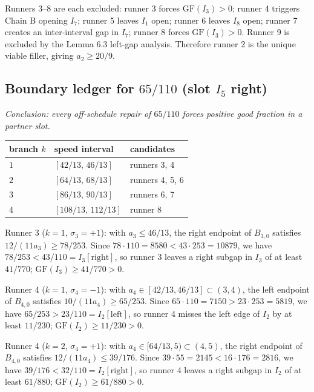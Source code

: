\documentclass[12pt]{article}
\begin{document}
Runners 3--8 are each excluded: runner 3 forces $\mathrm{GF}(I_3)>0$; runner 4 triggers
Chain B opening $I_7$; runner 5 leaves $I_1$ open; runner 6 leaves $I_8$ open;
runner 7 creates an inter-interval gap in $I_7$; runner 8 forces $\mathrm{GF}(I_3)>0$.
Runner 9 is excluded by the Lemma 6.3 left-gap analysis.
Therefore runner 2 is the unique viable filler, giving $a_2\ge 20/9$.

\subsection{Boundary ledger for $65/110$ (slot $I_5$ right)}

\emph{Conclusion: every off-schedule repair of $65/110$ forces positive good fraction in a
partner slot.}

\begin{center}
\begin{tabular}{@{}lll@{}}
\toprule
branch $k$ & speed interval & candidates \\
\midrule
$1$ & $[42/13,\,46/13]$ & runners 3, 4 \\
$2$ & $[64/13,\,68/13]$ & runners 4, 5, 6 \\
$3$ & $[86/13,\,90/13]$ & runners 6, 7 \\
$4$ & $[108/13,\,112/13]$ & runner 8 \\
\bottomrule
\end{tabular}
\end{center}

Runner 3 ($k=1$, $\sigma_3=+1$): with $a_3\le 46/13$, the right endpoint of $B_{3,0}$
satisfies $12/(11a_3)\ge 78/253$. Since $78\cdot110=8580<43\cdot253=10879$, we have
$78/253<43/110=I_3[\text{right}]$, so runner 3 leaves a right subgap in $I_3$ of at
least $41/770$; $\mathrm{GF}(I_3)\ge 41/770>0$.

Runner 4 ($k=1$, $\sigma_4=-1$): with $a_4\in[42/13,46/13]\subset(3,4)$, the left
endpoint of $B_{4,0}$ satisfies $10/(11a_4)\ge 65/253$. Since
$65\cdot110=7150>23\cdot253=5819$, we have $65/253>23/110=I_2[\text{left}]$, so runner 4
misses the left edge of $I_2$ by at least $11/230$; $\mathrm{GF}(I_2)\ge 11/230>0$.

Runner 4 ($k=2$, $\sigma_4=+1$): with $a_4\in[64/13,5)\subset(4,5)$, the right endpoint
of $B_{4,0}$ satisfies $12/(11a_4)\le 39/176$. Since $39\cdot55=2145<16\cdot176=2816$,
we have $39/176<32/110=I_2[\text{right}]$, so runner 4 leaves a right subgap in $I_2$ of
at least $61/880$; $\mathrm{GF}(I_2)\ge 61/880>0$.
\end{document}
